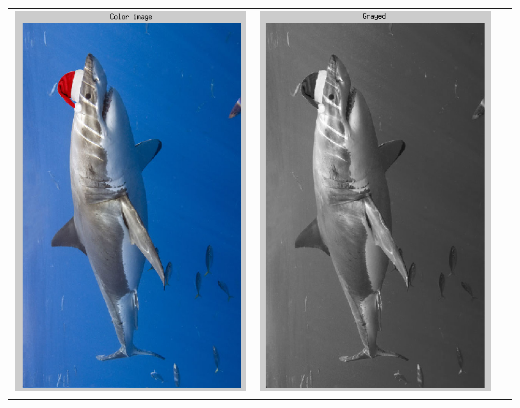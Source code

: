 \documentclass[12pt]{article}
\begin{document}
\begin{table}[h!]
\begin{center}
\begin{tabular} {c c c}
  \includegraphics[scale=.52]{Images/TotalModule/RGB.png}
&
  \includegraphics[scale=.52]{Images/TotalModule/Gray.png}

\end{tabular}
\end{center}
\end{table}
\end{document}
